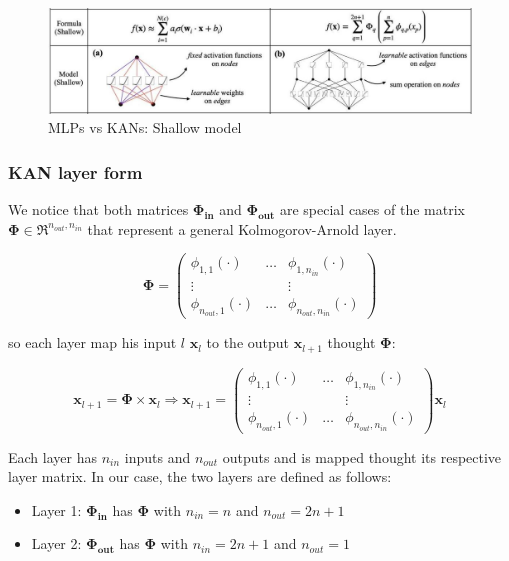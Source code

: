 \documentclass[12pt,a4paper]{article}
\begin{document}
\begin{figure}[H]
    \centering
    \includegraphics[width=0.8\linewidth]{Images/A.JPG}
    \caption{ MLPs vs KANs: Shallow model}
\end{figure}

\subsubsection{KAN layer form}
We notice that both matrices $\boldsymbol{\Phi_{in}}$ and $\boldsymbol{\Phi_{out}}$ are special cases of the matrix $\boldsymbol{\Phi} \in \Re^{n_{out},n_{in}}$ that represent a general Kolmogorov-Arnold layer. 

\[
\boldsymbol{\Phi} = 
\begin{pmatrix}
\phi_{1,1}(\cdot) & \dots & \phi_{1,n_{in}}(\cdot) \\
\vdots &   & \vdots \\
\phi_{n_{out},1}(\cdot) & \dots & \phi_{n_{out},n_{in}}(\cdot)
\end{pmatrix} 
\]

so each layer map his input $l$ $\textbf{x}_l$ to the output $\textbf{x}_{l+1}$ thought $\boldsymbol{\Phi}$:

\[
\textbf{x}_{l+1} = \boldsymbol{\Phi} \times \textbf{x}_l \Rightarrow
\textbf{x}_{l+1} = 
\begin{pmatrix}
\phi_{1,1}(\cdot) & \dots & \phi_{1,n_{in}}(\cdot) \\
\vdots &   & \vdots \\
\phi_{n_{out},1}(\cdot) & \dots & \phi_{n_{out},n_{in}}(\cdot)
\end{pmatrix} \textbf{x}_l
\]


Each layer has $n_{in}$ inputs and $n_{out}$ outputs and is mapped thought its respective layer matrix. In our case, the two layers are defined as follows:
\begin{itemize}
    \item Layer 1: $\boldsymbol{\Phi_{in}}$ has $\boldsymbol{\Phi}$ with $n_{in} = n$ and $n_{out} = 2n+1$
    \item Layer 2: $\boldsymbol{\Phi_{out}}$ has $\boldsymbol{\Phi}$ with $n_{in} = 2n+1$ and $n_{out} = 1$
\end{itemize}
\end{document}
